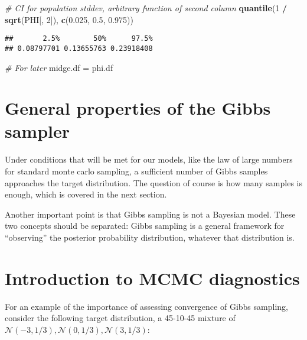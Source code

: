 \documentclass[]{article}
\newenvironment{Shaded}{\begin{snugshade}}{\end{snugshade}}
\newcommand{\CommentTok}[1]{\textcolor[rgb]{0.56,0.35,0.01}{\textit{#1}}}
\newcommand{\DecValTok}[1]{\textcolor[rgb]{0.00,0.00,0.81}{#1}}
\newcommand{\FloatTok}[1]{\textcolor[rgb]{0.00,0.00,0.81}{#1}}
\newcommand{\KeywordTok}[1]{\textcolor[rgb]{0.13,0.29,0.53}{\textbf{#1}}}
\newcommand{\NormalTok}[1]{#1}
\newcommand{\OperatorTok}[1]{\textcolor[rgb]{0.81,0.36,0.00}{\textbf{#1}}}
\newcommand{\StringTok}[1]{\textcolor[rgb]{0.31,0.60,0.02}{#1}}
\begin{document}
\begin{Shaded}
\begin{Highlighting}[]
\CommentTok{# CI for population stddev, arbitrary function of second column}
\KeywordTok{quantile}\NormalTok{(}\DecValTok{1} \OperatorTok{/}\StringTok{ }\KeywordTok{sqrt}\NormalTok{(PHI[, }\DecValTok{2}\NormalTok{]), }\KeywordTok{c}\NormalTok{(}\FloatTok{0.025}\NormalTok{, }\FloatTok{0.5}\NormalTok{, }\FloatTok{0.975}\NormalTok{))}
\end{Highlighting}
\end{Shaded}

\begin{verbatim}
##       2.5%        50%      97.5% 
## 0.08797701 0.13655763 0.23918408
\end{verbatim}

\begin{Shaded}
\begin{Highlighting}[]
\CommentTok{# For later}
\NormalTok{midge.df =}\StringTok{ }\NormalTok{phi.df}
\end{Highlighting}
\end{Shaded}

\hypertarget{general-properties-of-the-gibbs-sampler}{%
\section{General properties of the Gibbs
sampler}\label{general-properties-of-the-gibbs-sampler}}

Under conditions that will be met for our models, like the law of large
numbers for standard monte carlo sampling, a sufficient number of Gibbs
samples approaches the target distribution. The question of course is
how many samples is enough, which is covered in the next section.

Another important point is that Gibbs sampling is not a Bayesian model.
These two concepts should be separated: Gibbs sampling is a general
framework for ``observing'' the posterior probability distribution,
whatever that distribution is.

\hypertarget{introduction-to-mcmc-diagnostics}{%
\section{Introduction to MCMC
diagnostics}\label{introduction-to-mcmc-diagnostics}}

For an example of the importance of assessing convergence of Gibbs
sampling, consider the following target distribution, a 45-10-45 mixture
of \(\mathcal{N}(-3, 1/3), \mathcal{N}(0, 1/3), \mathcal{N}(3, 1/3)\):
\end{document}
